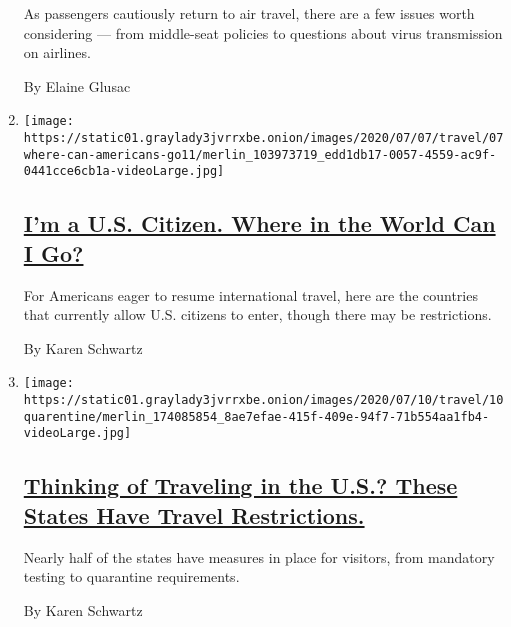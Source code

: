 \begin{enumerate}
  As passengers cautiously return to air travel, there are a few issues
  worth considering --- from middle-seat policies to questions about
  virus transmission on airlines.

  By Elaine Glusac
\item
  \texttt{[image: https://static01.graylady3jvrrxbe.onion/images/2020/07/07/travel/07where-can-americans-go11/merlin\_103973719\_edd1db17-0057-4559-ac9f-0441cce6cb1a-videoLarge.jpg]}

  \hypertarget{im-a-us-citizen-where-in-the-world-can-i-go}{%
  \subsection{\texorpdfstring{\href{/2020/07/07/travel/american-travelers-restrictions-coronavirus.html}{I'm
  a U.S. Citizen. Where in the World Can I
  Go?}}{I'm a U.S. Citizen. Where in the World Can I Go?}}\label{im-a-us-citizen-where-in-the-world-can-i-go}}

  For Americans eager to resume international travel, here are the
  countries that currently allow U.S. citizens to enter, though there
  may be restrictions.

  By Karen Schwartz
\item
  \texttt{[image: https://static01.graylady3jvrrxbe.onion/images/2020/07/10/travel/10quarentine/merlin\_174085854\_8ae7efae-415f-409e-94f7-71b554aa1fb4-videoLarge.jpg]}

  \hypertarget{thinking-of-traveling-in-the-us-these-states-have-travel-restrictions}{%
  \subsection{\texorpdfstring{\href{/2020/07/10/travel/state-travel-restrictions.html}{Thinking
  of Traveling in the U.S.? These States Have Travel
  Restrictions.}}{Thinking of Traveling in the U.S.? These States Have Travel Restrictions.}}\label{thinking-of-traveling-in-the-us-these-states-have-travel-restrictions}}

  Nearly half of the states have measures in place for visitors, from
  mandatory testing to quarantine requirements.

  By Karen Schwartz
\end{enumerate}

